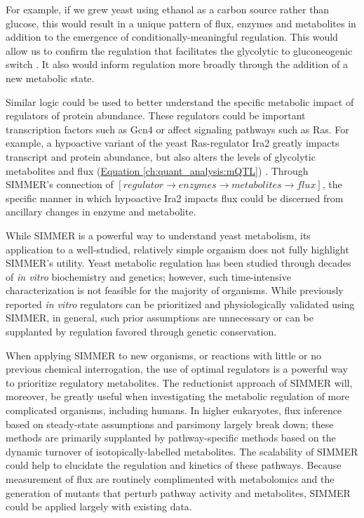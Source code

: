For example, if we grew yeast using ethanol as a carbon source rather than glucose, this would result in a unique pattern of flux, enzymes and metabolites in addition to the emergence of conditionally-meaningful regulation. This would allow us to confirm the regulation that facilitates the glycolytic to gluconeogenic switch \cite{Zampar:2013fr}. It also would inform regulation more broadly through the addition of a new metabolic state.

Similar logic could be used to better understand the specific metabolic impact of regulators of protein abundance. These regulators could be important transcription factors such as Gcn4 or affect signaling pathways such as Ras.  For example, a hypoactive variant of the yeast Ras-regulator Ira2 greatly impacts transcript and protein abundance, but also alters the levels of glycolytic metabolites and flux (\hyperref[ch:quant_analysis:mQTL]{Equation \ref{ch:quant_analysis:mQTL}}) \cite{Breunig:2014bu}. Through SIMMER's connection of $\left[regulator \rightarrow enzymes \rightarrow metabolites \rightarrow flux\right]$, the specific manner in which hypoactive Ira2 impacts flux could be discerned from ancillary changes in enzyme and metabolite. 

While SIMMER is a powerful way to understand yeast metabolism, its application to a well-studied, relatively simple organism does not fully highlight SIMMER's utility. Yeast metabolic regulation has been studied through decades of \textit{in vitro} biochemistry and genetics; however, such time-intensive characterization is not feasible for the majority of organisms. While previously reported \textit{in vitro} regulators can be prioritized and physiologically validated using SIMMER, in general, such prior assumptions are unnecessary or can be supplanted by regulation favored through genetic conservation.

When applying SIMMER to new organisms, or reactions with little or no previous chemical interrogation, the use of optimal regulators is a powerful way to prioritize regulatory metabolites. The reductionist approach of SIMMER will, moreover, be greatly useful when investigating the metabolic regulation of more complicated organisms, including humans. In higher eukaryotes, flux inference based on steady-state assumptions and parsimony largely break down; these methods are primarily supplanted by pathway-specific methods based on the dynamic turnover of isotopically-labelled metabolites. The scalability of SIMMER could help to elucidate the regulation and kinetics of these pathways. Because measurement of flux are routinely complimented with metabolomics and the generation of mutants that perturb pathway activity and metabolites, SIMMER could be applied largely with existing data.

